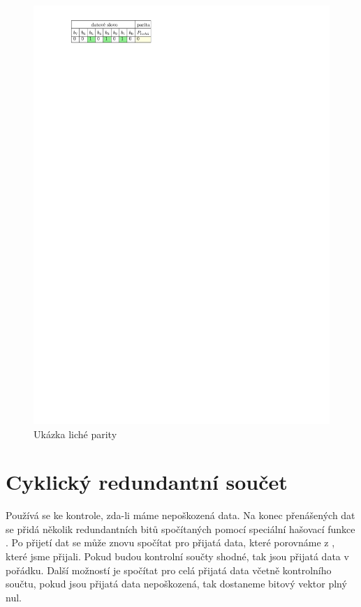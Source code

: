 \begin{figure}[H]
    \begin{center}
        \includegraphics[scale=1]{img/parita_licha}
    \end{center}
    \caption{Ukázka liché parity}
\end{figure}

\section{Cyklický redundantní součet}
Používá se ke kontrole, zda-li máme nepoškozená data. Na konec přenášených dat se přidá několik redundantních bitů spočítaných pomocí speciální hašovací funkce . Po přijetí dat se může znovu spočítat  pro přijatá data, které porovnáme z , které jsme přijali. Pokud budou kontrolní součty shodné, tak jsou přijatá data v pořádku. Další možností je spočítat  pro celá přijatá data včetně kontrolního součtu, pokud jsou přijatá data nepoškozená,  tak dostaneme bitový vektor plný nul.

